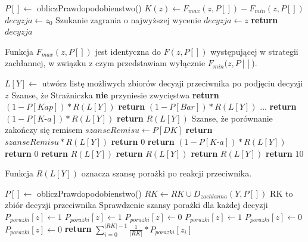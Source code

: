 \begin{algorithmic}[1]
	\State $P[] \gets$ obliczPrawdopodobienstwo()
			\State $K(z) \gets F_{max}(z, P[]) - F_{min}(z, P[])$
		\EndFor		
		\State $ decyzja \gets z_0$ \Comment Szukanie zagrania o najwyższej wycenie
				\State $decyzja \gets z$
			\EndIf
		\EndFor		
		\State \textbf{return} $decyzja$
	\EndFunction
\end{algorithmic}

Funkcja $F_{max}(z, P[])$ jest identyczna do $F(z, P[])$ występującej w strategii zachłannej, w związku z czym przedstawiam wyłącznie $F_{min}(z, P[]$).
\begin{algorithmic}[1]
		\State $L[Y] \gets$ utwórz listę możliwych zbiorów decyzji przeciwnika po podjęciu decyzji $z$
			 \Comment Szanse, że Strażniczka \textbf{nie} przyniesie zwycięstwa
				\State \textbf{return} $ (1 - P[Kap]) * R(L[Y]) $
			\EndCase
				\State \textbf{return} $ (1 - P[Bar]) * R(L[Y]) $
			\EndCase
				\State ...
				\State \textbf{return} $ (1 - P[\textit{K-a}]) * R(L[Y]) $
			\EndCase
				\State \textbf{return} $  R(L[Y]) $
			\EndCase
				\Comment Szanse, że porównanie zakończy się remisem 
				\State $ szanseRemisu \gets P[DK]$ 
				\State \textbf{return} $ szanseRemisu * R(L[Y]) $
			\EndCase
				\State \textbf{return} $ 0 $
			\EndCase
				\State \textbf{return} $ (1 - P[\textit{K-a}]) * R(L[Y]) $
			\EndCase
					\State \textbf{return} $ 0 $
				\Else
					\State \textbf{return} $ R(L[Y]) $
				\EndIf
			\EndCase
				\State \textbf{return} $ R(L[Y]) $
			\EndCase
				\State \textbf{return} $ R(L[Y]) $
			\EndCase
			\State \textbf{return} $ 10 $
			\EndCase
		\EndSwitch
	\EndFunction
\end{algorithmic}

Funkcja $R(L[Y])$ oznacza szansę porażki po reakcji przeciwnika.
\begin{algorithmic}[1]
			\State $P[] \gets$ obliczPrawdopodobienstwo()
			\State $RK \gets RK \cup D_{zachlanna}(Y, P[]) $	\Comment RK to zbiór decyzji przeciwnika
		\EndFor
			\Comment Sprawdzenie szansy porażki dla każdej decyzji
					\State $P_{porazki}[z] \gets 1$
				\EndCase
						\State $P_{porazki}[z] \gets 1$
					\Else
						\State $P_{porazki}[z] \gets 0$
					\EndIf
				\EndCase
						\State $P_{porazki}[z] \gets 1$
					\Else
						\State $P_{porazki}[z] \gets 0$
					\EndIf
				\EndCase
					$P_{porazki}[z] \gets 0$
				\EndCase
			\EndSwitch
		\EndFor
		\State \textbf{return} $ \sum_{i=0}^{|RK|-1} \frac{1}{|RK|} * P_{porazki}[z_i] $
	\EndFunction
\end{algorithmic}


